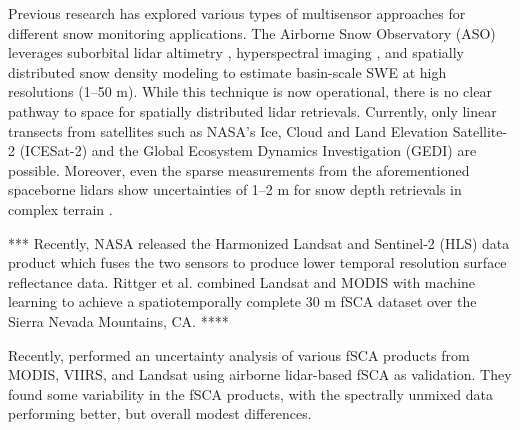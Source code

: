 Previous research has explored various types of multisensor approaches for different snow monitoring applications. The Airborne Snow Observatory (ASO) \citep{painterAirborneSnowObservatory2016} leverages suborbital lidar altimetry \citep{deemsLidarMeasurementSnow2013}, hyperspectral imaging \citep{nolinMappingAlpineSnow1993}, and spatially distributed snow density modeling \citep{marksSpatiallyDistributedEnergy1999,hedrickDirectInsertionNASA2018a,meyerOperationalWaterForecast2023a} to estimate basin-scale SWE at high resolutions (1--50 m). While this technique is now operational, there is no clear pathway to space for spatially distributed lidar retrievals. Currently, only linear transects from satellites such as NASA's Ice, Cloud and Land Elevation Satellite-2 (ICESat-2) \citep{abdalatiICESat2LaserAltimetry2010} and the Global Ecosystem Dynamics Investigation (GEDI) \citep{dubayahGlobalEcosystemDynamics2020} are possible. Moreover, even the sparse measurements from the aforementioned spaceborne lidars show uncertainties of 1--2 m for snow depth retrievals in complex terrain \citep{enderlinUncertaintyICESat2ATL062022, deschamps-bergerEvaluationSnowDepth2022}. 

*** Recently, NASA released the Harmonized Landsat and Sentinel-2 (HLS) data product which fuses the two sensors to produce lower temporal resolution surface reflectance data.
Rittger et al. \citep{rittgerMultisensorFusionUsing2021} combined Landsat and MODIS with machine learning to achieve a spatiotemporally complete 30 m fSCA dataset over the Sierra Nevada Mountains, CA. ****

Recently, \cite{stillingerLandsatMODISVIIRS2023a} performed an uncertainty analysis of various fSCA products from MODIS, VIIRS, and Landsat using airborne lidar-based fSCA as validation. They found some variability in the fSCA products, with the spectrally unmixed data performing better, but overall modest differences. \cite{bairHowTradeoffsSatellite2023}


